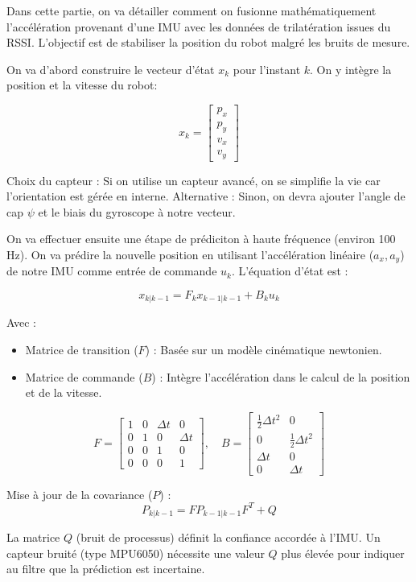 \documentclass[11pt, a4paper]{article}
\begin{document}
Dans cette partie, on va détailler comment on fusionne mathématiquement l'accélération provenant d'une IMU avec les données de trilatération issues du RSSI. L'objectif est de stabiliser la position du robot malgré les bruits de mesure.

On va d'abord construire le vecteur d'état $x_k$ pour l'instant $k$. On y intègre la position et la vitesse du robot:

$$x_k = \begin{bmatrix} p_x \\ p_y \\ v_x \\ v_y \end{bmatrix}$$

Choix du capteur : Si on utilise un capteur avancé, on se simplifie la vie car l'orientation est gérée en interne.
Alternative : Sinon, on devra ajouter l'angle de cap $\psi$ et le biais du gyroscope à notre vecteur.

On va effectuer ensuite une étape de prédiciton à haute fréquence (environ 100 Hz). On va prédire la nouvelle position en utilisant l'accélération linéaire ($a_x, a_y$) de notre IMU comme entrée de commande $u_k$.
L'équation d'état est :

$$x_{k|k-1} = F_k x_{k-1|k-1} + B_k u_k$$

Avec :
\begin{itemize}
	\item Matrice de transition ($F$) : Basée sur un modèle cinématique newtonien.
	\item Matrice de commande ($B$) : Intègre l'accélération dans le calcul de la position et de la vitesse.
\end{itemize}

$$F = \begin{bmatrix} 
1 & 0 & \Delta t & 0 \\ 
0 & 1 & 0 & \Delta t \\ 
0 & 0 & 1 & 0 \\ 
0 & 0 & 0 & 1 
\end{bmatrix}, \quad 
B = \begin{bmatrix} 
\frac{1}{2}\Delta t^2 & 0 \\ 
0 & \frac{1}{2}\Delta t^2 \\ 
\Delta t & 0 \\ 
0 & \Delta t 
\end{bmatrix}$$

Mise à jour de la covariance ($P$) :
$$P_{k|k-1} = F P_{k-1|k-1} F^T + Q$$

La matrice $Q$ (bruit de processus) définit la confiance accordée à l'IMU. Un capteur bruité (type MPU6050) nécessite une valeur $Q$ plus élevée pour indiquer au filtre que la prédiction est incertaine.
\end{document}
